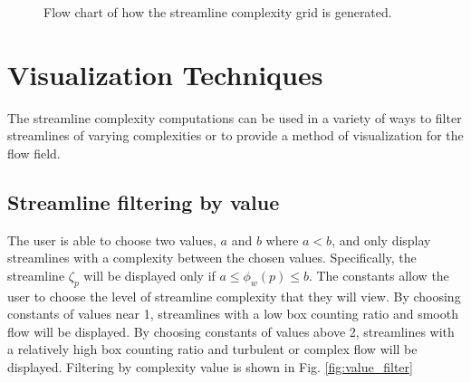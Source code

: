 \documentclass{egpubl}
\begin{document}
\begin{figure}
    \caption{Flow chart of how the streamline complexity grid is generated.}
    \label{fig:algorithm_flowchart}
\end{figure}

\section{Visualization Techniques} \label{sec:vt}

The streamline complexity computations can be used in a variety of ways to filter streamlines of varying complexities or to provide a method of visualization for the flow field.

\subsection{Streamline filtering by value}
The user is able to choose two values, $a$ and $b$ where $a < b$, and only display streamlines with a complexity between the chosen values. 
Specifically, the streamline $\zeta_p$ will be displayed only if $a \leq \phi_w(p) \leq b$.
The constants allow the user to choose the level of streamline complexity that they will view.
By choosing constants of values near 1, streamlines with a low box counting ratio and smooth flow will be displayed.
By choosing constants of values above 2, streamlines with a relatively high box counting ratio and turbulent or complex flow will be displayed.
Filtering by complexity value is shown in Fig. \ref{fig:value_filter}
\end{document}
